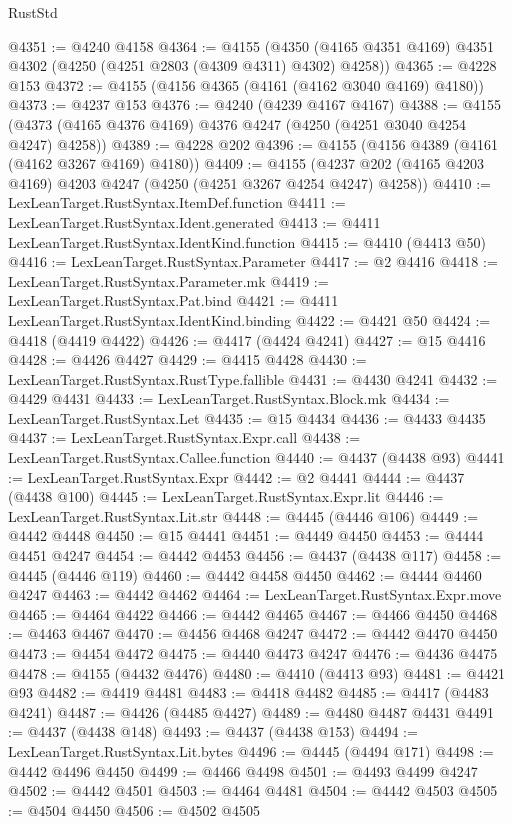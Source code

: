\begin{lexlean}{RustStd}
\begin{coremodule}
@4351 := @4240 @4158
@4364 := @4155
    (@4350 (@4165 @4351 @4169) @4351 @4302 (@4250 (@4251 @2803 (@4309 @4311) @4302) @4258))
@4365 := @4228 @153
@4372 := @4155 (@4156 @4365 (@4161 (@4162 @3040 @4169) @4180))
@4373 := @4237 @153
@4376 := @4240 (@4239 @4167 @4167)
@4388 := @4155 (@4373 (@4165 @4376 @4169) @4376 @4247 (@4250 (@4251 @3040 @4254 @4247) @4258))
@4389 := @4228 @202
@4396 := @4155 (@4156 @4389 (@4161 (@4162 @3267 @4169) @4180))
@4409 := @4155 (@4237 @202 (@4165 @4203 @4169) @4203 @4247 (@4250 (@4251 @3267 @4254 @4247) @4258))
@4410 := LexLeanTarget.RustSyntax.ItemDef.function
@4411 := LexLeanTarget.RustSyntax.Ident.generated
@4413 := @4411 LexLeanTarget.RustSyntax.IdentKind.function
@4415 := @4410 (@4413 @50)
@4416 := LexLeanTarget.RustSyntax.Parameter
@4417 := @2 @4416
@4418 := LexLeanTarget.RustSyntax.Parameter.mk
@4419 := LexLeanTarget.RustSyntax.Pat.bind
@4421 := @4411 LexLeanTarget.RustSyntax.IdentKind.binding
@4422 := @4421 @50
@4424 := @4418 (@4419 @4422)
@4426 := @4417 (@4424 @4241)
@4427 := @15 @4416
@4428 := @4426 @4427
@4429 := @4415 @4428
@4430 := LexLeanTarget.RustSyntax.RustType.fallible
@4431 := @4430 @4241
@4432 := @4429 @4431
@4433 := LexLeanTarget.RustSyntax.Block.mk
@4434 := LexLeanTarget.RustSyntax.Let
@4435 := @15 @4434
@4436 := @4433 @4435
@4437 := LexLeanTarget.RustSyntax.Expr.call
@4438 := LexLeanTarget.RustSyntax.Callee.function
@4440 := @4437 (@4438 @93)
@4441 := LexLeanTarget.RustSyntax.Expr
@4442 := @2 @4441
@4444 := @4437 (@4438 @100)
@4445 := LexLeanTarget.RustSyntax.Expr.lit
@4446 := LexLeanTarget.RustSyntax.Lit.str
@4448 := @4445 (@4446 @106)
@4449 := @4442 @4448
@4450 := @15 @4441
@4451 := @4449 @4450
@4453 := @4444 @4451 @4247
@4454 := @4442 @4453
@4456 := @4437 (@4438 @117)
@4458 := @4445 (@4446 @119)
@4460 := @4442 @4458 @4450
@4462 := @4444 @4460 @4247
@4463 := @4442 @4462
@4464 := LexLeanTarget.RustSyntax.Expr.move
@4465 := @4464 @4422
@4466 := @4442 @4465
@4467 := @4466 @4450
@4468 := @4463 @4467
@4470 := @4456 @4468 @4247
@4472 := @4442 @4470 @4450
@4473 := @4454 @4472
@4475 := @4440 @4473 @4247
@4476 := @4436 @4475
@4478 := @4155 (@4432 @4476)
@4480 := @4410 (@4413 @93)
@4481 := @4421 @93
@4482 := @4419 @4481
@4483 := @4418 @4482
@4485 := @4417 (@4483 @4241)
@4487 := @4426 (@4485 @4427)
@4489 := @4480 @4487 @4431
@4491 := @4437 (@4438 @148)
@4493 := @4437 (@4438 @153)
@4494 := LexLeanTarget.RustSyntax.Lit.bytes
@4496 := @4445 (@4494 @171)
@4498 := @4442 @4496 @4450
@4499 := @4466 @4498
@4501 := @4493 @4499 @4247
@4502 := @4442 @4501
@4503 := @4464 @4481
@4504 := @4442 @4503
@4505 := @4504 @4450
@4506 := @4502 @4505

\end{coremodule}
\end{lexlean}
